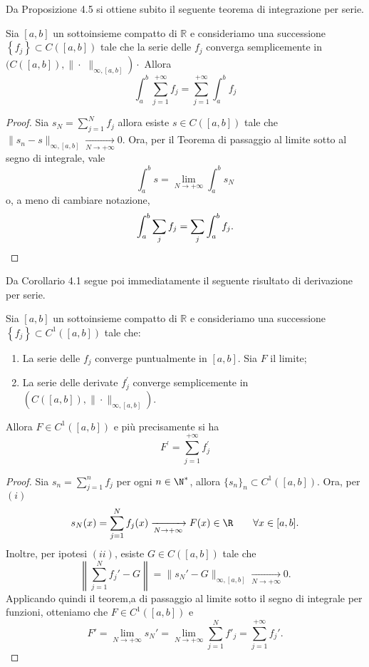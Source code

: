 Da Proposizione 4.5 si ottiene subito il seguente teorema di integrazione per serie.

\begin{corollary}[$\circ$]
    Sia $[a, b]$ un sottoinsieme compatto di $\mathbb{R}$ e consideriamo una successione $\left\{f_{j}\right\} \subset C([a, b])$ tale che la serie delle $f_{j}$ converga semplicemente in $(C([a, b]), \| \cdot$ $\left.\|_{\infty,[a, b]}\right) \cdot$ Allora
    \[\int_{a}^{b} \sum_{j=1}^{+\infty} f_{j}=\sum_{j=1}^{+\infty} \int_{a}^{b} f_{j}\]
\end{corollary}
\begin{proof}
    Sia $s_N = \sum_{j=1}^N f_j$ allora esiste $s\in C([a,b])$ tale che $\|s_n-s\|_{\infty,[a,b]}\xrightarrow[N\to+\infty]{}0$. Ora, per il Teorema di passaggio al limite sotto al segno di integrale, vale 
    \[\int_a^b s = \lim_{N\to +\infty}\int_a^bs_N\]
    o, a meno di cambiare notazione, 
    \[\int_a^b \sum_j f_j = \sum_j\int_a^b f_j.\qedhere\]
\end{proof}

Da Corollario 4.1 segue poi immediatamente il seguente risultato di derivazione per serie. 

\begin{corollary}[$\circ$]\label{cor: 4.6}
    Sia $[a, b]$ un sottoinsieme compatto di $\mathbb{R}$ e consideriamo una successione $\left\{f_{j}\right\} \subset C^{1}([a, b])$ tale che:
    \begin{enumerate}[i]
        \item La serie delle $f_{j}$ converge puntualmente in $[a, b]$. Sia $F$ il limite;
        \item La serie delle derivate $f_{j}^{\prime}$ converge semplicemente in $\left(C([a, b]),\|\cdot\|_{\infty,[a, b]}\right)$.
    \end{enumerate}

    Allora $F \in C^{1}([a, b])$ e più precisamente si ha
    \[F^{\prime}=\sum_{j=1}^{+\infty} f_{j}^{\prime}\]
\end{corollary}
\begin{proof}
    Sia $s_n = \sum_{j=1}^nf_j$ per ogni $n\in \N^*$, allora $\{s_n\}_n\subset C^1([a,b])$. Ora, per $(i)$
    \[s_N(x) = \sum_{j=1}^Nf_j(x) \xrightarrow[N\to +\infty]{}F(x)\in \R\qquad \forall x \in [a,b].\]
    Inoltre, per ipotesi $(ii)$, esiste $G\in C([a,b])$ tale che 
    \[\left\|\sum_{j=1}^Nf_j'-G\right\| = \|s_N'-G\|_{\infty, [a,b]}\xrightarrow[N\to +\infty]{}0.\]
    Applicando quindi il teorem,a di passaggio al limite sotto il segno di integrale per funzioni, otteniamo che $F\in C^1([a,b])$ e 
    \[F' = \lim_{N\to +\infty} s_N' = \lim_{N\to +\infty}\sum_{j=1}^Nf'_j = \sum_{j=1}^{+\infty}f_j'.\]
\end{proof}


